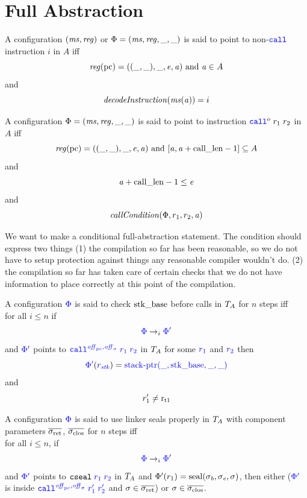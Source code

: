 \documentclass[a4paper]{article}
\begin{document}
\section{Full Abstraction}
\begin{definition}
  \label{def:points-to-instr}
  A configuration $(\ms,\reg)$ {\sourcecolor or $\Phi = (\ms,\reg,\_,\_)$} is said to point to non-$\scall{}{}{}$ instruction $i$ in $A$ iff
  \[
    \reg(\pcreg) = ((\_,\_),\_,\eaddr,\aaddr) \tand \aaddr \in A
  \]
and
\[
  \decInstr{\ms(\aaddr)} = i
\]
\end{definition}

\begin{definition}
  \label{def:points-to-call}
  A configuration {\sourcecolor $\Phi = (\ms,\reg,\_,\_)$} is said to point to instruction $\scall{o}{r_1}{r_2}$ in $A$ iff
  \[
    \reg(\pcreg) = ((\_,\_),\_,\eaddr,\aaddr) \tand [\aaddr,\aaddr+\calllen-1] \subseteq A
  \]
and
\[
  \aaddr+\calllen - 1 \leq \eaddr
\]
and
\[
  \callCond{\Phi,r_1,r_2,\aaddr}
\]
\end{definition}
We want to make a conditional full-abstraction statement. The condition should express two things (1) the compilation so far has been reasonable, so we do not have to setup protection against things any reasonable compiler wouldn't do. (2) the compilation so far has taken care of certain checks that we do not have information to place correctly at this point of the compilation.
\begin{definition}
  \label{def:check-stack-addr-before-call}
  A configuration $\src{\Phi}$ is said to check $\stkb$ before calls in $\ta$ for $n$ steps iff\\
  for all $i \leq n$ if
  \[
    \src{\Phi} \nstep[i] \src{\Phi'}
  \]
  and $\src{\Phi'}$ points to $\src{\scall{\offpc,\offsigma}{r_1}{r_2}}$ in $\ta$ for some $\src{r_1}$ and $\src{r_2}$
  then
  \[
    \src{\Phi'}(\src{r_\stk}) = \src{\stkptr{\_,\stkb,\_,\_}}
  \]
  and
  \[
    r_1' \neq \rtmp{1}
  \]
\end{definition}

\begin{definition}
  \label{def:use-return-seals-call}
  A configuration $\src{\Phi}$ is said to use linker seals properly in $\ta$ with component parameters $\sigrets$, $\sigcloss$ for $n$ steps iff\\
  for all $i \leq n$, if
  \[
    \src{\Phi} \nstep[i] \src{\Phi'}
  \]
  and $\src{\Phi'}$ points to $\src{\tcseal{r_1}{r_2}}$ in $\ta$ and $\Phi'(r_1) = \seal{\sigma_\baddr,\sigma_\eaddr,\sigma}$, then either ($\src{\Phi'}$ is inside $\src{\scall{\offpc,\offsigma}{r_1'}{r_2'}}$ and $\sigma \in \sigrets$) or $\sigma \in \sigcloss$.
\end{definition}
\end{document}
